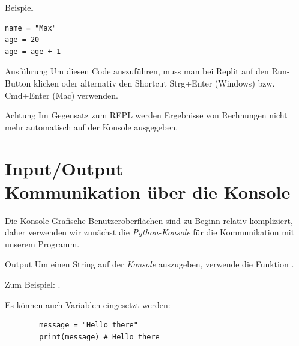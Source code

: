 \begin{fragile}[]
\begin{exampleblock}{Beispiel}
\begin{verbatim}
name = "Max"
age = 20
age = age + 1
\end{verbatim}
\end{exampleblock}

\vspace{12pt}

\pause
\begin{block}{Ausführung}
\vspace{2pt}
Um diesen Code auszuführen, muss man bei Replit auf den Run-Button klicken oder alternativ den Shortcut Strg+Enter (Windows) bzw. Cmd+Enter (Mac) verwenden.  
\end{block}

\vspace{12pt}

\pause

\begin{alertblock}{Achtung}
\vspace{2pt}
Im Gegensatz zum REPL werden Ergebnisse von Rechnungen nicht mehr automatisch auf der Konsole ausgegeben. 
\end{alertblock}

\end{fragile}



\section{Input/Output \\ \footnotesize Kommunikation über die Konsole}


\begin{frame}

\begin{block}{Die Konsole}
\vspace{2pt}
Grafische Benutzeroberflächen sind zu Beginn relativ kompliziert, daher verwenden wir zunächst die \emph{Python-Konsole} für die Kommunikation mit unserem Programm. 
\end{block}

\end{frame}

\begin{fragile}[]
	
	\begin{block}{Output}
		\vspace{2pt}
		Um einen String auf der \emph{Konsole} auszugeben, verwende die Funktion . 
		
		
		Zum Beispiel: . 
		\pause
		
		\vspace{12pt}
		
		Es können auch Variablen eingesetzt werden: 
		\begin{verbatim}
		message = "Hello there"
		print(message) # Hello there
		\end{verbatim}
		
	\end{block}
	
\end{fragile}

